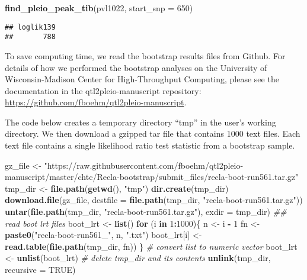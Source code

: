 \documentclass[oneside]{book}
\newenvironment{Shaded}{\begin{snugshade}}{\end{snugshade}}
\newcommand{\CommentTok}[1]{\textcolor[rgb]{0.56,0.35,0.01}{\textit{#1}}}
\newcommand{\ControlFlowTok}[1]{\textcolor[rgb]{0.13,0.29,0.53}{\textbf{#1}}}
\newcommand{\DataTypeTok}[1]{\textcolor[rgb]{0.13,0.29,0.53}{#1}}
\newcommand{\DecValTok}[1]{\textcolor[rgb]{0.00,0.00,0.81}{#1}}
\newcommand{\KeywordTok}[1]{\textcolor[rgb]{0.13,0.29,0.53}{\textbf{#1}}}
\newcommand{\NormalTok}[1]{#1}
\newcommand{\OperatorTok}[1]{\textcolor[rgb]{0.81,0.36,0.00}{\textbf{#1}}}
\newcommand{\OtherTok}[1]{\textcolor[rgb]{0.56,0.35,0.01}{#1}}
\newcommand{\StringTok}[1]{\textcolor[rgb]{0.31,0.60,0.02}{#1}}
\begin{document}
\begin{Shaded}
\begin{Highlighting}[]
\KeywordTok{find_pleio_peak_tib}\NormalTok{(pvl1022, }\DataTypeTok{start_snp =} \DecValTok{650}\NormalTok{)}
\end{Highlighting}
\end{Shaded}

\begin{verbatim}
## loglik139 
##       788
\end{verbatim}

To save computing time, we read the bootstrap results files from Github.
For details of how we performed the bootstrap analyses on the University
of Wisconsin-Madison Center for High-Throughput Computing, please see
the documentation in the qtl2pleio-manuscript repository:
\url{https://github.com/fboehm/qtl2pleio-manuscript}.

The code below creates a temporary directory ``tmp'' in the user's
working directory. We then download a gzipped tar file that contains
1000 text files. Each text file contains a single likelihood ratio test
statistic from a bootstrap sample.

\begin{Shaded}
\begin{Highlighting}[]
\NormalTok{gz_file <-}\StringTok{ "https://raw.githubusercontent.com/fboehm/qtl2pleio-manuscript/master/chtc/Recla-bootstrap/submit_files/recla-boot-run561.tar.gz"}
\NormalTok{tmp_dir <-}\StringTok{ }\KeywordTok{file.path}\NormalTok{(}\KeywordTok{getwd}\NormalTok{(), }\StringTok{"tmp"}\NormalTok{)}
\KeywordTok{dir.create}\NormalTok{(tmp_dir)}
\KeywordTok{download.file}\NormalTok{(gz_file, }\DataTypeTok{destfile =} \KeywordTok{file.path}\NormalTok{(tmp_dir, }\StringTok{"recla-boot-run561.tar.gz"}\NormalTok{))}
\KeywordTok{untar}\NormalTok{(}\KeywordTok{file.path}\NormalTok{(tmp_dir, }\StringTok{"recla-boot-run561.tar.gz"}\NormalTok{), }\DataTypeTok{exdir =}\NormalTok{ tmp_dir)}
\CommentTok{## read boot lrt files}
\NormalTok{boot_lrt <-}\StringTok{ }\KeywordTok{list}\NormalTok{()}
\ControlFlowTok{for}\NormalTok{ (i }\ControlFlowTok{in} \DecValTok{1}\OperatorTok{:}\DecValTok{1000}\NormalTok{)\{}
\NormalTok{  n <-}\StringTok{ }\NormalTok{i }\OperatorTok{-}\StringTok{ }\DecValTok{1}
\NormalTok{  fn <-}\StringTok{ }\KeywordTok{paste0}\NormalTok{(}\StringTok{"recla-boot-run561_"}\NormalTok{, n, }\StringTok{".txt"}\NormalTok{)}
\NormalTok{  boot_lrt[i] <-}\StringTok{ }\KeywordTok{read.table}\NormalTok{(}\KeywordTok{file.path}\NormalTok{(tmp_dir, fn))}
\NormalTok{\}}
\CommentTok{# convert list to numeric vector}
\NormalTok{boot_lrt <-}\StringTok{ }\KeywordTok{unlist}\NormalTok{(boot_lrt)}
\CommentTok{# delete tmp_dir and its contents}
\KeywordTok{unlink}\NormalTok{(tmp_dir, }\DataTypeTok{recursive =} \OtherTok{TRUE}\NormalTok{)}
\end{Highlighting}
\end{Shaded}
\end{document}
